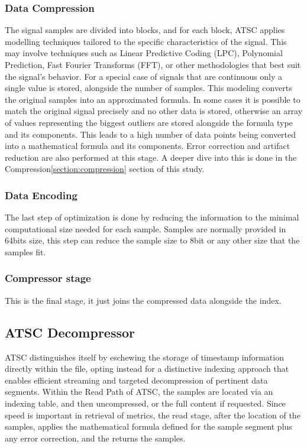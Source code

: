 \documentclass[conference]{IEEEtran}
\begin{document}
\subsubsection{Data Compression}
The signal samples are divided into blocks, and for each block, ATSC applies modelling techniques tailored to the specific characteristics of the signal. 
This may involve techniques such as Linear Predictive Coding (LPC), Polynomial Prediction, Fast Fourier Transforms (FFT), or other methodologies that best suit the signal's behavior. 
For a special case of signals that are continuous only a single value is stored, alongside the number of samples.
This modeling converts the original samples into an approximated formula.
In some cases it is possible to match the original signal precisely and no other data is stored, otherwise an array of values representing the biggest outliers are stored alongside the formula type and its components.
This leads to a high number of data points being converted into a mathematical formula and its components.
Error correction and artifact reduction are also performed at this stage.
A deeper dive into this is done in the Compression\ref{section:compression} section of this study.

\subsubsection{Data Encoding}
The last step of optimization is done by reducing the information to the minimal computational size needed for each sample. 
Samples are normally provided in 64bits size, this step can reduce the sample size to 8bit or any other size that the samples fit.

\subsubsection{Compressor stage}
This is the final stage, it just joins the compressed data alongside the index.


\subsection{ATSC Decompressor}

ATSC distinguishes itself by eschewing the storage of timestamp information directly within the file, opting instead for a distinctive indexing approach that enables efficient streaming and targeted decompression of pertinent data segments.
Within the Read Path of ATSC, the samples are located via an indexing table, and then uncompressed, or the full content if requested. 
Since speed is important in retrieval of metrics, the read stage, after the location of the samples, applies the mathematical formula defined for the sample segment plus any error correction, and the returns the samples. 
\end{document}
